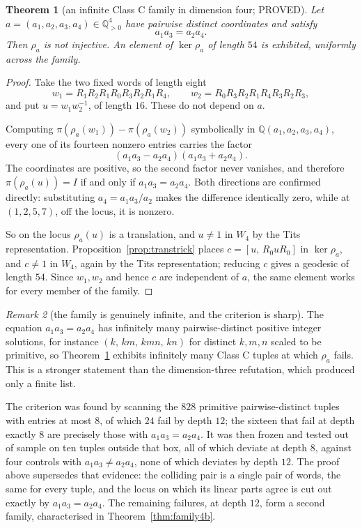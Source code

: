 \documentclass[11pt]{article}
\newtheorem{theorem}{Theorem}[section]
\theoremstyle{definition}
\theoremstyle{remark}
\newtheorem{remark}[theorem]{Remark}
\theoremstyle{definition}
\newcommand{\Q}{\mathbb{Q}}
\begin{document}
\begin{theorem}[an infinite Class C family in dimension four; PROVED]\label{thm:family4}
Let $a=(a_1,a_2,a_3,a_4)\in\Q_{>0}^4$ have pairwise distinct coordinates and satisfy
\[
   a_1a_3=a_2a_4 .
\]
Then $\rho_a$ is not injective. An element of $\ker\rho_a$ of length $54$ is exhibited, uniformly
across the family.
\end{theorem}

\begin{proof}
Take the two fixed words of length eight
\[
   w_1=R_1R_2R_1R_0R_3R_2R_1R_4,\qquad w_2=R_0R_3R_2R_1R_4R_3R_2R_3 ,
\]
and put $u=w_1w_2^{-1}$, of length $16$. These do not depend on $a$.

Computing $\pi(\rho_a(w_1))-\pi(\rho_a(w_2))$ symbolically in $\Q(a_1,a_2,a_3,a_4)$, every one of
its fourteen nonzero entries carries the factor
\[
   (a_1a_3-a_2a_4)(a_1a_3+a_2a_4) .
\]
The coordinates are positive, so the second factor never vanishes, and therefore
$\pi(\rho_a(u))=I$ if and only if $a_1a_3=a_2a_4$. Both directions are confirmed directly:
substituting $a_4=a_1a_3/a_2$ makes the difference identically zero, while at $(1,2,5,7)$, off the
locus, it is nonzero.

So on the locus $\rho_a(u)$ is a translation, and $u\ne1$ in $W_4$ by the Tits representation.
Proposition~\ref{prop:transtrick} places $c=[u,\,R_0uR_0]$ in $\ker\rho_a$, and $c\ne1$ in $W_4$,
again by the Tits representation; reducing $c$ gives a geodesic of length $54$. Since $w_1,w_2$
and hence $c$ are independent of $a$, the same element works for every member of the family.
\end{proof}

\begin{remark}[the family is genuinely infinite, and the criterion is sharp]\label{rem:family4}
The equation $a_1a_3=a_2a_4$ has infinitely many pairwise-distinct positive integer solutions, for
instance $(k,\,km,\,kmn,\,kn)$ for distinct $k,m,n$ scaled to be primitive, so
Theorem~\ref{thm:family4} exhibits infinitely many Class C tuples at which $\rho_a$ fails. This is
a stronger statement than the dimension-three refutation, which produced only a finite list.

The criterion was found by scanning the $828$ primitive pairwise-distinct tuples with entries at
most $8$, of which $24$ fail by depth $12$; the sixteen that fail at depth exactly $8$ are
precisely those with $a_1a_3=a_2a_4$. It was then frozen and tested out of sample on ten tuples
outside that box, all of which deviate at depth $8$, against four controls with
$a_1a_3\ne a_2a_4$, none of which deviates by depth $12$. The proof above supersedes that
evidence: the colliding pair is a single pair of words, the same for every tuple, and the locus
on which its linear parts agree is cut out exactly by $a_1a_3=a_2a_4$. The remaining failures, at depth $12$, form a second family, characterised in
Theorem~\ref{thm:family4b}.
\end{remark}
\end{document}

